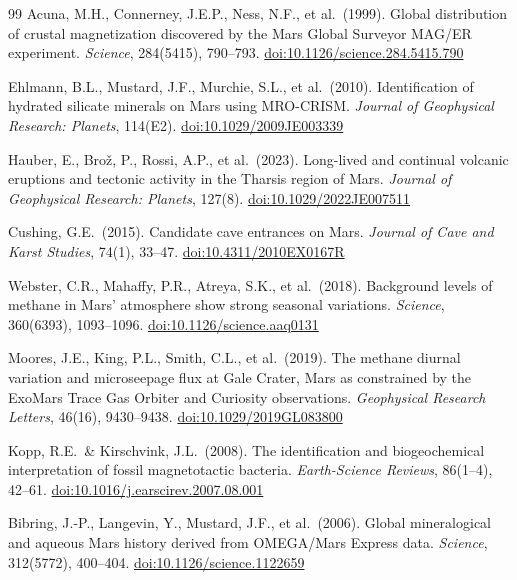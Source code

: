 \documentclass[11pt, a4paper]{article}
\begin{document}
\begin{thebibliography}{99}
Acuna, M.H., Connerney, J.E.P.,
Ness, N.F., et al.\ (1999).
Global distribution of crustal
magnetization discovered by the Mars
Global Surveyor MAG/ER experiment.
\textit{Science}, 284(5415), 790--793.
\href{https://doi.org/10.1126/science.284.5415.790}
{doi:10.1126/science.284.5415.790}

Ehlmann, B.L., Mustard, J.F.,
Murchie, S.L., et al.\ (2010).
Identification of hydrated silicate
minerals on Mars using MRO-CRISM.
\textit{Journal of Geophysical Research:
Planets}, 114(E2).
\href{https://doi.org/10.1029/2009JE003339}
{doi:10.1029/2009JE003339}

Hauber, E., Brož, P., Rossi, A.P.,
et al.\ (2023).
Long-lived and continual volcanic
eruptions and tectonic activity in
the Tharsis region of Mars.
\textit{Journal of Geophysical Research:
Planets}, 127(8).
\href{https://doi.org/10.1029/2022JE007511}
{doi:10.1029/2022JE007511}

Cushing, G.E.\ (2015).
Candidate cave entrances on Mars.
\textit{Journal of Cave and Karst
Studies}, 74(1), 33--47.
\href{https://doi.org/10.4311/2010EX0167R}
{doi:10.4311/2010EX0167R}

Webster, C.R., Mahaffy, P.R.,
Atreya, S.K., et al.\ (2018).
Background levels of methane in Mars'
atmosphere show strong seasonal
variations.
\textit{Science}, 360(6393), 1093--1096.
\href{https://doi.org/10.1126/science.aaq0131}
{doi:10.1126/science.aaq0131}

Moores, J.E., King, P.L., Smith, C.L.,
et al.\ (2019).
The methane diurnal variation and
microseepage flux at Gale Crater, Mars
as constrained by the ExoMars Trace
Gas Orbiter and Curiosity observations.
\textit{Geophysical Research Letters},
46(16), 9430--9438.
\href{https://doi.org/10.1029/2019GL083800}
{doi:10.1029/2019GL083800}

Kopp, R.E.\ \& Kirschvink, J.L.\
(2008).
The identification and biogeochemical
interpretation of fossil magnetotactic
bacteria.
\textit{Earth-Science Reviews},
86(1--4), 42--61.
\href{https://doi.org/10.1016/j.earscirev.2007.08.001}
{doi:10.1016/j.earscirev.2007.08.001}

Bibring, J.-P., Langevin, Y.,
Mustard, J.F., et al.\ (2006).
Global mineralogical and aqueous Mars
history derived from OMEGA/Mars Express
data.
\textit{Science}, 312(5772), 400--404.
\href{https://doi.org/10.1126/science.1122659}
{doi:10.1126/science.1122659}


\end{thebibliography}
\end{document}
